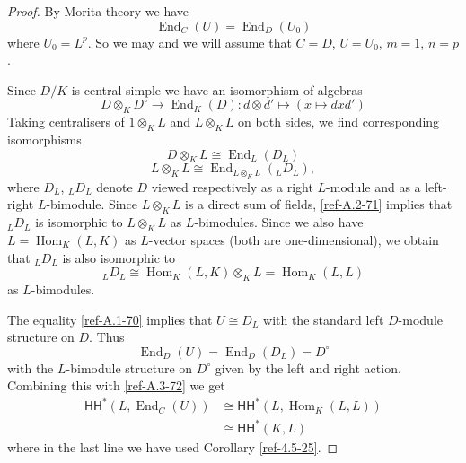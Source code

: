 \documentclass{amsart}
\numberwithin{equation}{section}
\theoremstyle{definition}
\theoremstyle{remark}
\begin{document}
\begin{proof}
By Morita theory we have 
\[
{\operatorname {End}}_C(U)={\operatorname {End}}_D(U_0)
\]
where $U_0=L^p$. So we may and we will assume that $C=D$, $U=U_0$, $m=1$, $n=p$.

\medskip

Since $D/K$ is central simple we have an isomorphism of algebras
\[
D\otimes_K D^\circ{\rightarrow}{\operatorname {End}}_K(D):d\otimes d'\mapsto (x\mapsto dxd')
\]
Taking centralisers of $1\otimes_K L$ and $L\otimes_KL$ on both sides, we find corresponding
isomorphisms
\begin{equation}
\label{ref-A.1-70}
D\otimes_K L\cong {\operatorname {End}}_L(D_L)
\end{equation}
\begin{equation}
\label{ref-A.2-71}
L\otimes_K L\cong {\operatorname {End}}_{L\otimes_K L}({}_L D_L),
\end{equation}
where $D_L$, ${}_L D_L$ denote $D$ viewed respectively as a right $L$-module and as a left-right $L$-bimodule. Since $L\otimes_K L$ is a direct sum of fields, \eqref{ref-A.2-71} implies that ${}_L D_L$ is isomorphic
to $L\otimes_K L$ as $L$-bimodules.  Since we also have  $L={\operatorname {Hom}}_K(L,K)$ as $L$-vector spaces (both are one-dimensional),
we obtain that ${}_L D_L$ is also isomorphic to
\begin{equation}
\label{ref-A.3-72}
{}_LD_L \cong {\operatorname {Hom}}_K(L,K)\otimes_K L={\operatorname {Hom}}_K(L,L)
\end{equation}
as $L$-bimodules.

The equality \eqref{ref-A.1-70} implies  that $U\cong D_L$ with the standard left $D$-module structure on $D$. Thus
\[
{\operatorname {End}}_D(U)={\operatorname {End}}_D(D_L)=D^\circ
\]
with the $L$-bimodule structure on $D^\circ$ given by the left and right action. Combining this with \eqref{ref-A.3-72}
we get
\begin{align*}
{\mathsf{HH}}^\ast(L,{\operatorname {End}}_C(U))
&\cong {\mathsf{HH}}^\ast(L,{\operatorname {Hom}}_K(L,L))\\
&\cong {\mathsf{HH}}^\ast(K,L)
\end{align*}
where in the last line we have used Corollary \ref{ref-4.5-25}.
\end{proof}
  
\end{document}
